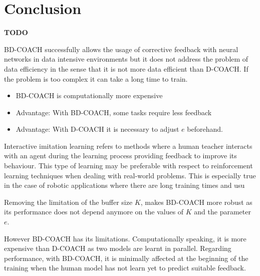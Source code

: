 \chapter{Conclusion}
\label{chapter:conclusion}

\textbf{TODO}



BD-COACH successfully allows the usage of corrective feedback with neural networks in data intensive environments but it does not address the problem of data efficiency in the sense that it is not more data efficient than D-COACH. If the problem is too complex it can take a long time to train.

\begin{itemize}
  \item BD-COACH is computationally more expensive
  \item Advantage: With BD-COACH, some tasks require less feedback
  \item Advantage: With D-COACH it is necessary to adjust $e$ beforehand.
\end{itemize}
Interactive imitation learning refers to methods where a human teacher interacts with an agent during the learning process providing feedback to improve its behaviour. This type of learning may be preferable with respect to reinforcement learning techniques when dealing with real-world problems. This is especially true in the case of robotic applications where there are long training times and usu

Removing the limitation of the buffer size $K$, makes BD-COACH more robust as its performance does not depend anymore on the values of $K$ and the parameter $e$.

However BD-COACH has its limitations. Computationally speaking, it is more expensive than D-COACH as two models are learnt in parallel. Regarding performance, with BD-COACH, it is minimally affected at the beginning of the training when the human model has not learn yet to predict suitable feedback.